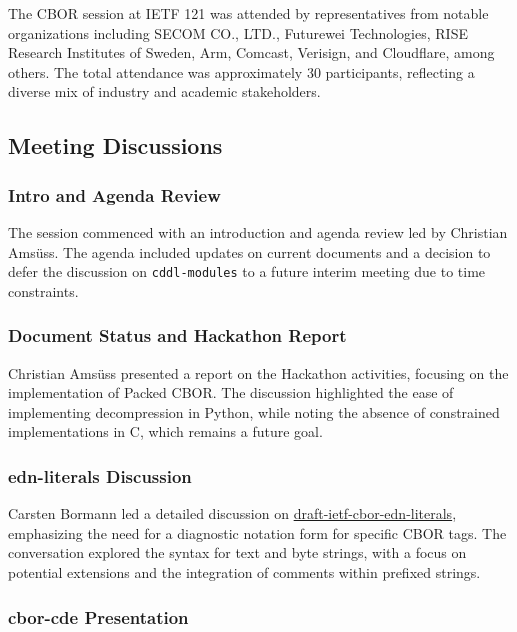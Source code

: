 \documentclass{article}
\begin{document}
The CBOR session at IETF 121 was attended by representatives from notable organizations including SECOM CO., LTD., Futurewei Technologies, RISE Research Institutes of Sweden, Arm, Comcast, Verisign, and Cloudflare, among others. The total attendance was approximately 30 participants, reflecting a diverse mix of industry and academic stakeholders.

\subsection{Meeting Discussions}

\subsubsection{Intro and Agenda Review}

The session commenced with an introduction and agenda review led by Christian Amsüss. The agenda included updates on current documents and a decision to defer the discussion on \texttt{cddl-modules} to a future interim meeting due to time constraints.

\subsubsection{Document Status and Hackathon Report}

Christian Amsüss presented a report on the Hackathon activities, focusing on the implementation of Packed CBOR. The discussion highlighted the ease of implementing decompression in Python, while noting the absence of constrained implementations in C, which remains a future goal.

\subsubsection{edn-literals Discussion}

Carsten Bormann led a detailed discussion on \href{https://datatracker.ietf.org/doc/html/draft-ietf-cbor-edn-literals}{draft-ietf-cbor-edn-literals}, emphasizing the need for a diagnostic notation form for specific CBOR tags. The conversation explored the syntax for text and byte strings, with a focus on potential extensions and the integration of comments within prefixed strings.

\subsubsection{cbor-cde Presentation}
\end{document}
